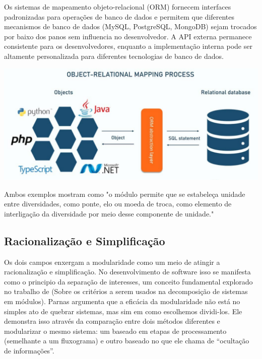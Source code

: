 \documentclass[12pt]{article}
\begin{document}
\vspace{5px}

\noindent
\begin{minipage}{0.6\textwidth}\raggedright
Os sistemas de mapeamento objeto-relacional (ORM) fornecem interfaces padronizadas para operações de banco de dados e permitem que diferentes mecanismos de banco de dados (MySQL, PostgreSQL, MongoDB) sejam trocados por baixo dos panos sem influencia no desenvolvedor.
A API externa permanece consistente para os desenvolvedores, enquanto a implementação interna pode ser altamente personalizada para diferentes tecnologias de banco de dados.
\end{minipage}
\begin{minipage}{0.4\textwidth}
\includegraphics[width=1\textwidth]{orm.png}
\end{minipage}


\vspace{20px}
Ambos exemplos mostram como "o módulo permite que se estabeleça unidade entre diversidades, como ponte, elo ou moeda de troca, como elemento de interligação da diversidade por meio desse componente de unidade." \cite{piculoportugal2024modulo}

\subsection{Racionalização e Simplificação}
Os dois campos enxergam a modularidade como um meio de atingir a racionalização e simplificação. No desenvolvimento de software isso se manifesta como o principio da separação de interesses, um conceito fundamental explorado no trabalho de \cite{parnas1972criteria} (Sobre os critérios a serem usados na decomposição de sistemas em módulos). Parnas argumenta que a eficácia da modularidade não está no simples ato de quebrar sistemas, mas sim em como escolhemos dividi-los. Ele demonstra isso através da comparação entre dois métodos diferentes e modularizar o mesmo sistema: um baseado em etapas de processamento (semelhante a um fluxograma) e outro baseado no que ele chama de “ocultação de informações”.
\end{document}
